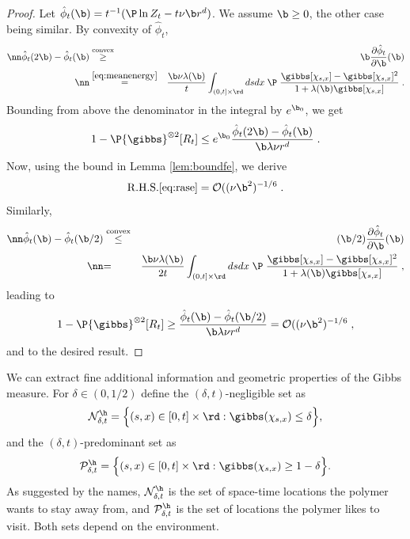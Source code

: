 \begin{proof} Let $\hat \phi_t(\b)= t^{-1} ( \P \ln Z_t - t \nu \b r^d)$. We assume $\b \geq 0$, the other case being similar.  By convexity of $\hat \phi_t$,
\begin{eqnarray}\nn
\hat \phi_t(2\b) - \hat \phi_t(\b) &\stackrel{\rm convex}{\geq}& \b \frac{\partial \hat \phi_t }{ \partial \b} (\b) \\ \nn
&\stackrel{\eqref{eq:meanenergy}}{=}&  \frac{\b \nu \lambda(\b)}{t} \int_{(0,t]\times \rd}ds dx\; \P \;
 \frac{\gibbs[  \chi_{s,x}]- \gibbs[  \chi_{s,x}]^2}{1+ \lambda(\b) \gibbs[\chi_{s,x}]} \;.
 \end{eqnarray}
Bounding from above the denominator in the integral by $e^{\b_0}$, we get
\begin{equation} \label{eq:rase}
1- \P {\gibbs}^{\otimes 2} [R_t] \leq e^{\b_0} \frac{\hat \phi_t(2\b) - \hat \phi_t(\b)}{\b \lambda \nu r^d}\;.
\end{equation}
Now, using the bound in Lemma \ref{lem:boundfe}, we derive
$$
{\rm R.H.S.} \eqref{eq:rase} = {\cal O}((\nu \b^2)^{-1/6}\;.
$$
Similarly,
\begin{eqnarray}\nn
\hat \phi_t(\b) - \hat \phi_t(\b/2) &\stackrel{\rm convex}{\leq}& (\b/2) \frac{\partial \hat \phi_t }{ \partial \b} (\b) \\ \nn
&{=}&  \frac{\b \nu \lambda(\b)}{2t} \int_{(0,t]\times \rd}ds dx\; \P \;
 \frac{\gibbs[  \chi_{s,x}]- \gibbs[  \chi_{s,x}]^2}{1+ \lambda(\b) \gibbs[\chi_{s,x}]} \;,
 \end{eqnarray}
leading to 
$$
1- \P {\gibbs}^{\otimes 2} [R_t] \geq \frac{\hat \phi_t(\b) - \hat \phi_t(\b/2)}{\b \lambda \nu r^d}  = {\cal O}((\nu \b^2)^{-1/6}\;,
$$
and to the desired result.
\end{proof} 
We can 
extract fine additional  information and geometric properties of the Gibbs measure.
For $\delta \in (0,1/2)$ define the $(\delta,t)$-negligible set as
$$
{\cal N}_{\delta,t}^\h =  \Big\{(s,x) \in [0,t]\times \rd  : \gibbs(\chi_{s,x}) \leq \delta\Big\}, 
$$ 
and the  $(\delta,t)$-predominant set as
$$
{\cal P}_{\delta,t}^\h =  \Big\{(s,x) \in [0,t]\times \rd  : \gibbs(\chi_{s,x}) \geq 1-\delta\Big\}.
$$ 
As suggested by the names, ${\cal N}_{\delta,t}^\h$ is the set of space-time locations the polymer wants to stay
away from, and ${\cal P}_{\delta,t}^\h$ is  the set of  locations the polymer likes to visit. Both sets depend on the environment.
